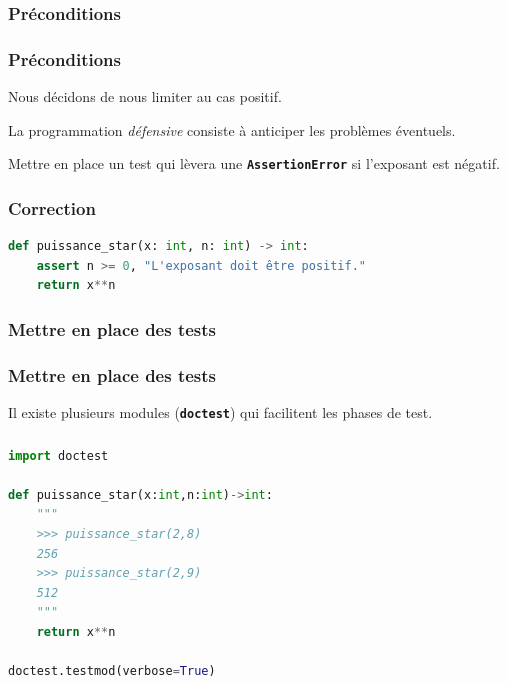 \documentclass[svgnames,11pt]{beamer}
\begin{document}
\subsubsection{Préconditions}
\begin{frame}
    \frametitle{Préconditions}

    Nous décidons de nous limiter au cas positif.
    \begin{aretenir}[]
        La programmation \emph{défensive} consiste à anticiper les problèmes éventuels.
    \end{aretenir}
    \begin{activite}
        Mettre en place un test qui lèvera une \textbf{\texttt{AssertionError}} si l'exposant est négatif.
        \end{activite}
        
\end{frame}
\begin{frame}[fragile]
    \frametitle{Correction}

\begin{center}
\begin{lstlisting}[language=Python , basicstyle=\ttfamily\small, xleftmargin=1em, xrightmargin=0.5em]
def puissance_star(x: int, n: int) -> int:
    assert n >= 0, "L'exposant doit être positif."
    return x**n
\end{lstlisting}
\label{CODE}
\end{center}

\end{frame}
\subsubsection{Mettre en place des tests}
\begin{frame}
    \frametitle{Mettre en place des tests}

    Il existe plusieurs modules (\textbf{\texttt{doctest}}) qui facilitent les phases de test.   

\end{frame}
\begin{frame}[fragile]
    \frametitle{}

    \begin{center}
    \begin{lstlisting}[language=Python , basicstyle=\ttfamily\small, xleftmargin=2em, xrightmargin=2em]
import doctest

def puissance_star(x:int,n:int)->int:
    """
    >>> puissance_star(2,8)
    256
    >>> puissance_star(2,9)
    512
    """
    return x**n

doctest.testmod(verbose=True)
\end{lstlisting}
    \label{CODE}
    \end{center}

\end{frame}
\end{document}

